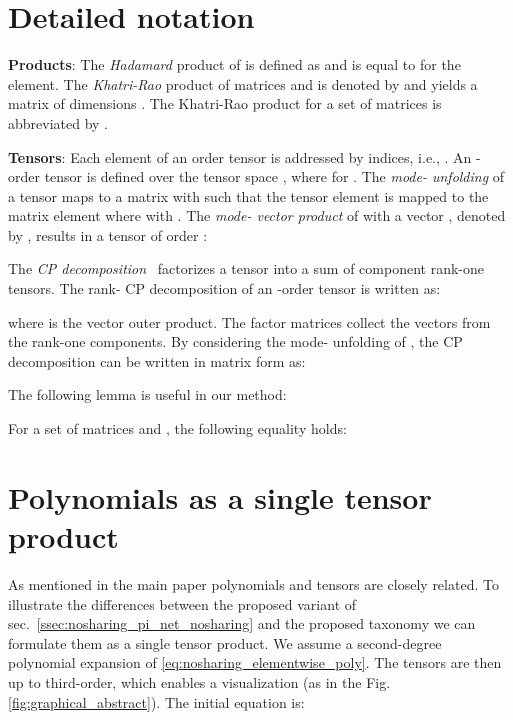 \documentclass[runningheads]{llncs}
\providecommand{\citep}{\cite}
\providecommand{\citet}{\cite}
\begin{document}
 

\clearpage



\newpage
\appendix


\section{Detailed notation}
\label{sec:nosharing_notation_supplem}

\textbf{Products}: The \textit{Hadamard} product of  is defined as  and is equal to  for the  element. The \textit{Khatri-Rao} product of matrices 
and  is
denoted by  and yields a matrix of
dimensions .  The Khatri-Rao product for a set of matrices   is abbreviated by .

\textbf{Tensors}: Each element of an  order tensor  is addressed by  indices, i.e., . An -order tensor  is  defined over the
tensor space , where  for . 
 The \textit{mode- unfolding} of a tensor  maps
  to a matrix  with  such
 that the tensor element  is
 mapped to the matrix element  where
  with . 
The \textit{mode- vector product} of  with a
vector , denoted by
, results in a tensor of order :

The \textit{CP decomposition}~\citep{kolda2009tensor} factorizes a tensor into a sum of component rank-one tensors. The rank- CP decomposition of an -order tensor  is written as:
 
where  is the vector outer product. The factor matrices  collect 
the vectors from the rank-one components. By considering the mode- unfolding of , the CP decomposition can be written in matrix form as: 

 


The following lemma is useful in our method: 

\begin{lemma} [\citet{chrysos2019polygan}]
For a set of  matrices   and , the following equality holds:

\label{lemma:polygan_lemma_hadamard_kr2}
\end{lemma}









\section{Polynomials as a single tensor product}
\label{ssec:nosharing_explanation_motivational_figure}

As mentioned in the main paper polynomials and tensors are closely related. To illustrate the differences between the proposed variant of sec.~\ref{ssec:nosharing_pi_net_nosharing} and the proposed taxonomy we can formulate them as a single tensor product. We assume a second-degree polynomial expansion of \eqref{eq:nosharing_elementwise_poly}. The tensors are then up to third-order, which enables a visualization (as in the Fig.\ref{fig:graphical_abstract}). The initial equation is: 
\end{document}
